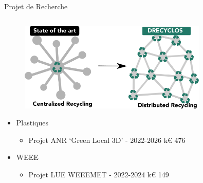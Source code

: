 \documentclass[
  11pt,
  ignorenonframetext,
  aspectratio=169,
  c]{beamer}
\providecommand{\tightlist}{%
  \setlength{\itemsep}{0pt}\setlength{\parskip}{0pt}}\usepackage{longtable,booktabs,array}
\begin{document}
\begin{frame}[t]{Projet de Recherche}
\protect\hypertarget{projet-de-recherche-1}{}
\begin{columns}[T]
\begin{column}{0.6\textwidth}
\begin{figure}

{\centering \includegraphics[width=0.8\textwidth,height=\textheight]{Figures/slides/ERC.png}

}

\end{figure}

\footnotesize

\begin{itemize}
\tightlist
\item
  Plastiques

  \begin{itemize}
  \tightlist
  \item
    Projet ANR `Green Local 3D' - 2022-2026 \textbar{} k€ 476
  \end{itemize}
\item
  WEEE

  \begin{itemize}
  \tightlist
  \item
    Projet LUE WEEEMET - 2022-2024 \textbar{} k€ 149
  \end{itemize}
\end{itemize}
\end{column}


\end{columns}
\end{frame}
\end{document}
